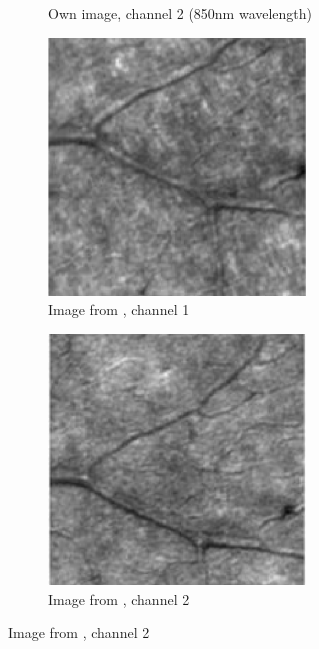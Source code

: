 \documentclass[]{article}
\begin{document}
\begin{figure}[ht]
\begin{subfigure}[b]{.4\textwidth}
		\caption{Own image, channel 2 (850nm wavelength)}
		\label{fig:own-channel-b}
	\end{subfigure}
	\vfill
	\centering
	\begin{subfigure}[t]{.4\textwidth}
		\centering
		\includegraphics[width=0.75\textwidth, scale=0.75]{de_castro_channel_1.png}
		\caption{Image from \cite{castro_rapid_2016}, channel 1}
		\label{fig:de-castro-channel-a}
	\end{subfigure}
	\hfill
	\centering
	\begin{subfigure}[t]{0.4\textwidth}
		\centering
		\includegraphics[width=0.75\textwidth, scale=0.75]{de_castro_channel_2.png}
		\caption{Image from \cite{castro_rapid_2016}, channel 2}
		\label{fig:de-castro-channel-b}
	\end{subfigure}

\end{figure}
\end{document}
